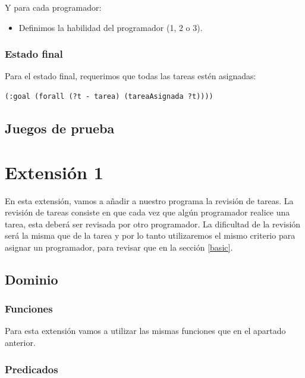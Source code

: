 \documentclass[11pt]{article}
\begin{document}
\noindent
Y para cada programador:
\begin{itemize}
  	\item Definimos la habilidad del programador (1, 2 o 3).
\end{itemize}

\subsubsection{Estado final}
Para el estado final, requerimos que todas las tareas estén asignadas:

\begin{verbatim}
(:goal (forall (?t - tarea) (tareaAsignada ?t))))
\end{verbatim}

\subsection{Juegos de prueba}


\section{Extensión 1}

En esta extensión, vamos a añadir a nuestro programa la revisión de tareas.
La revisión de tareas consiste en que cada vez que algún programador realice una tarea, esta deberá ser revisada por otro programador. La dificultad de la revisión será la misma que de la tarea y por lo tanto utilizaremos el mismo criterio para asignar un programador, para revisar que en la sección \ref{basic}.

\subsection{Dominio}
\subsubsection{Funciones}

Para esta extensión vamos a utilizar las mismas funciones que en el apartado anterior.

\subsubsection{Predicados}
\end{document}
